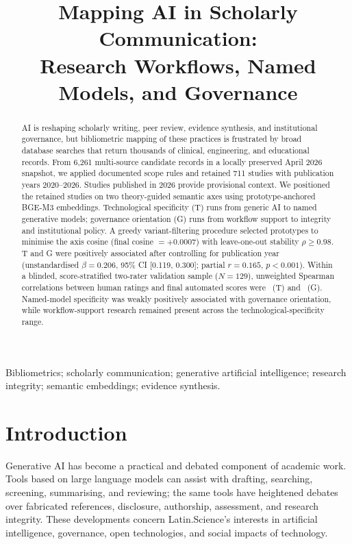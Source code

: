 \documentclass[a4paper,10pt,conference]{IEEEtran}
\title{Mapping AI in Scholarly Communication:\\
Research Workflows, Named Models, and Governance}
\author{\IEEEauthorblockN{Jedson Gabriel Ferreira de Paula, Joaquim de Oliveira Vieira,\\
Willian Francisco da Silva, Claudio R. M. Mauricio}
\IEEEauthorblockA{Universidade Estadual do Oeste do Paran\'a (UNIOESTE)\\
Foz do Igua\c{c}u, Paran\'a, Brazil}}
\author{}
\begin{document}
\maketitle

\begin{abstract}
AI is reshaping scholarly writing, peer review, evidence synthesis, and
institutional governance, but bibliometric mapping of these practices is
frustrated by broad database searches that return thousands of clinical,
engineering, and educational records. From 6,261 multi-source candidate records
in a locally preserved April 2026 snapshot, we applied documented scope rules
and retained 711 studies with publication years 2020--2026. Studies published
in 2026 provide provisional context. We positioned the retained studies on
two theory-guided semantic axes using prototype-anchored
BGE-M3 embeddings. Technological specificity (T) runs from generic AI to named
generative models; governance orientation (G) runs from workflow support to
integrity and institutional policy. A greedy variant-filtering procedure
selected prototypes to minimise the axis cosine (final cosine $=+0.0007$) with
leave-one-out stability $\rho \geq 0.98$. T and G were positively associated
after controlling for publication year (unstandardised $\beta=0.206$, 95\% CI
[0.119, 0.300]; partial $r=0.165$, $p<0.001$). Within a blinded, score-stratified
two-rater validation sample ($N=129$), unweighted Spearman correlations between
human ratings and final automated scores were \ValidationRhoT{}~(T) and
\ValidationRhoG{}~(G). Named-model specificity was weakly positively associated
with governance orientation, while workflow-support research remained present
across the technological-specificity range.
\end{abstract}

\renewcommand{\IEEEkeywordsname}{Keywords}
\begin{IEEEkeywords}
Bibliometrics; scholarly communication; generative artificial intelligence;
research integrity; semantic embeddings; evidence synthesis.
\end{IEEEkeywords}

\section{Introduction}

Generative AI has become a practical and debated component of academic work.
Tools based on large language models can assist with drafting, searching,
screening, summarising, and reviewing; the same tools have heightened debates
over fabricated references, disclosure, authorship, assessment, and research
integrity. These developments concern Latin.Science's interests in artificial
intelligence, governance, open technologies, and social impacts of technology.
\end{document}
